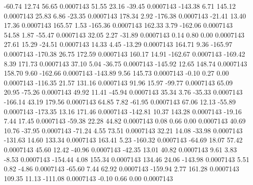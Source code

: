       -60.74       12.74       56.65     0.0007143
       51.55       23.16      -39.45     0.0007143
     -143.38        6.71      145.12     0.0007143
       25.83        6.86      -23.35     0.0007143
      178.34        2.92     -176.38     0.0007143
      -21.41       13.40       17.36     0.0007143
      165.57        1.53     -165.36     0.0007143
      162.33        3.79     -162.06     0.0007143
       54.58        1.87      -55.47     0.0007143
       32.05        2.27      -31.89     0.0007143
        0.14        0.80        0.00     0.0007143
       27.61       15.29      -24.51     0.0007143
       14.33        4.45      -13.29     0.0007143
      164.71        9.36     -165.97     0.0007143
     -170.38       26.75      172.59     0.0007143
      160.17       14.91     -162.67     0.0007143
     -169.42        8.39      171.73     0.0007143
       37.10        5.04      -36.75     0.0007143
     -145.92       12.65      148.74     0.0007143
      158.70        9.60     -162.66     0.0007143
     -143.89        9.56      145.73     0.0007143
       -0.10        0.27        0.00     0.0007143
     -116.35       21.57      131.16     0.0007143
       91.96       15.97      -99.77     0.0007143
       65.09       20.95      -75.26     0.0007143
       49.92       11.41      -45.94     0.0007143
       35.34        3.76      -35.33     0.0007143
     -166.14       43.19      179.56     0.0007143
       64.85        7.82      -61.95     0.0007143
       67.06       12.13      -55.89     0.0007143
     -173.35       13.16      171.46     0.0007143
     -142.81       10.37      143.28     0.0007143
      -19.16        7.44       17.45     0.0007143
      -59.38       22.28       44.82     0.0007143
        0.08        0.66        0.00     0.0007143
       40.69       10.76      -37.95     0.0007143
      -71.24        4.55       73.51     0.0007143
       32.21       14.08      -33.98     0.0007143
     -131.63       14.60      133.34     0.0007143
      163.41        5.23     -160.32     0.0007143
      -64.69       18.07       57.42     0.0007143
       45.60       12.42      -40.96     0.0007143
      -42.35       13.01       40.82     0.0007143
        9.61        3.83       -8.53     0.0007143
     -154.44        4.08      155.34     0.0007143
      134.46       24.06     -143.98     0.0007143
        5.51        0.82       -4.86     0.0007143
      -65.60        7.44       62.92     0.0007143
     -159.94        2.77      161.28     0.0007143
      109.35       11.13     -111.08     0.0007143
       -0.10        0.66        0.00     0.0007143
